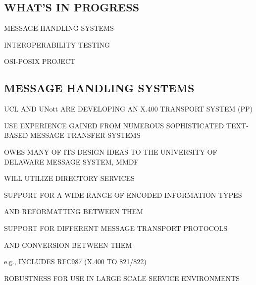 \begin{bwslide}
\part	{WHAT'S IN PROGRESS}\bf

\begin{nrtc}
\item	MESSAGE HANDLING SYSTEMS

\item	INTEROPERABILITY TESTING

\item	OSI-POSIX PROJECT
\end{nrtc}
\end{bwslide}


\begin{bwslide}
\part*	{MESSAGE HANDLING SYSTEMS}\bf

\begin{nrtc}
\item	UCL AND UNott ARE DEVELOPING AN X.400 TRANSPORT SYSTEM (PP)

\item	USE EXPERIENCE GAINED FROM NUMEROUS SOPHISTICATED TEXT-BASED MESSAGE
	TRANSFER SYSTEMS

\item	OWES MANY OF ITS DESIGN IDEAS TO THE UNIVERSITY OF DELAWARE MESSAGE
	SYSTEM, MMDF

\item	WILL UTILIZE DIRECTORY SERVICES
\end{nrtc}
\end{bwslide}




\begin{bwslide}

\begin{nrtc}
\item	SUPPORT FOR A WIDE RANGE OF ENCODED INFORMATION TYPES 
    \begin{nrtc}
    \item	AND REFORMATTING BETWEEN THEM
    \end{nrtc}

\item	SUPPORT FOR DIFFERENT MESSAGE TRANSPORT PROTOCOLS
    \begin{nrtc}
    \item	AND CONVERSION BETWEEN THEM
    \end{nrtc}
    e.g., INCLUDES RFC987 (X.400 TO 821/822)

\item	ROBUSTNESS FOR USE IN LARGE SCALE SERVICE ENVIRONMENTS
\end{nrtc}
\end{bwslide}


